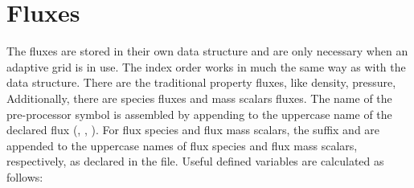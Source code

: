 \begin{comment}
\begin{flashtip}
The \code{Flash.h} file defines many of the quantities that were previously
stored in the database in \flashx. In \flashx, the user had to get
an `integer' key to access a variable stored in the \code{unk}
data structure, but in \flashx we access the variable's index directly using a \code{\#define}d
constant.  For example, the density variable can be accessed from the
\code{unk} data structure by \code{unk(DENS_VAR,i,j,k,blockID)}.
In a FIXEDBLOCKSIZE simulation \code{unk} has the dimensions:

\begin{codeseg}
 unk(UNK_VARS_BEGIN:UNK_VARS_END,
     GRID_ILO_GC:GRID_IHI_GC,
     GRID_JLO_GC:GRID_JHI_GC,
     GRID_KLO_GC:GRID_KHI_GC,
     MAXBLOCKS)
\end{codeseg}

The next example illustrates how data is stored in \code{unk} in 
\flashx and \flashx:\newline

\flashx:
\begin{codeseg}
idens = dBaseKeyNumber('dens')  ! get index of variable
call dBasePutData(idens, ......)        ! make call to the routine
\end{codeseg}

\flashx: 
\begin{codeseg}
call Grid_putPointData(blockID, CENTER, DENS_VAR, .....)  !use index DENS_VAR 
\end{codeseg}

Note: In \flashx the user declared the number of species in a simulation
in the \code{Config} file with the \code{NSPECIES} keyword.  In \flashx the user 
only declares a species with the keyword \code{SPECIES}.  The number of species
is summed by the setup script as it parses the various \code{Config} files
in the simulation.  The \code{NSPECIES} keyword in no longer used in \flashx \code{Config} files.
\end{flashtip}
\end{comment}


\section{Fluxes}
\label{Sec:FlashHfluxes}
The fluxes are stored in their own data structure and are only necessary
when an adaptive grid is in use.  The index order works in much the
same way as with the  data structure.  There are the traditional
property fluxes, like density, pressure, \etc  Additionally, there are 
species fluxes and mass scalars fluxes. The name of the pre-processor symbol is
assembled by 
appending  to the uppercase name of the declared flux (\eg,
, ). 
For flux species and flux mass scalars,
the suffix  and  are appended to 
the uppercase names of flux species and flux mass scalars, respectively, as declared in the
 file.
Useful defined variables are calculated as follows:


